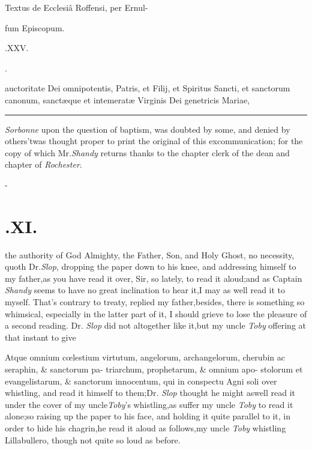 \documentclass{article}
\begin{document}
\null\smallskip
\centerline{Textus de Ecclesiâ Roffensi, per Ernul-}
\centerline{fum Episcopum.}
\bigskip
\centerline{\large{}.\quad XXV.}
\bigskip
\centerline{\large{}.}

 auctoritate Dei omnipotentis, Patris, et Filij, et Spiritus Sancti, et
sanctorum canonum, sanctæque et intemeratæ Virginis Dei genetricis Mariae,

\vfill
\bgroup\fontsize{8}{10}\selectfont
\hrule
{} \textit{Sor\-bonne} upon the question of
baptism, was doubted by some, and denied by others\tsh ’twas
thought proper to print the original of this excommunication; for the copy of
which Mr.\@ \textit{Shandy} returns thanks to the chapter clerk of the dean and
chapter of \textit{Rochester}.\par
\egroup
{}
\newpage
\def\alt#1#2{\hbox{\vbox to
3.6ex{\vss\openup-7pt\halign{##\cr\hss\tiny #2\hss\cr#1\cr}}}}
\def\c#1{\hbox to 0pt{\hss #1\hss}}
\null\kern-\baselineskip
\section{.\quad  XI.}

the authority of God Almighty, the Father, Son, and Holy Ghost,
no necessity, quoth Dr.\@ \textit{Slop}, dropping the paper down to his knee, and
addressing himself to my father,\tsh as you have read it over, Sir, so lately, to
read it aloud;\tsk\break and as Captain \textit{Shandy} seems to have no great inclination
to hear it,\tsh I may as well read it to myself. That’s contrary to treaty, replied
my father,\tsk besides, there is something so whimsical, especially in the latter
part of it, I should grieve to lose the pleasure of a second reading.  Dr.\@
\textit{Slop} did not altogether like it,\tsh but my uncle \textit{Toby} offering at
that instant to give

\null\vfill
\quad\tsh Atque omnium cœlestium\break
virtutum, angelorum, archangelorum,\break
{}\break
cherubin ac seraphin, \& sanctorum pa-\break
triarchum, prophetarum, \& omnium apo-\break
stolorum et evangelistarum, \& sanctorum\break
innocentum, qui in conspectu Agni soli
over whistling, and read it himself to them;\tsh Dr.\@
\textit{Slop} thought he might as\break well read it under the cover
of my uncle\break \textit{Toby}’s whistling,\tsk as suffer my uncle
\textit{Toby} to read it alone;\tsh so raising up the paper to
his face, and holding it quite parallel to it, in order to hide
his chagrin,\tsk\break he read it aloud as follows,\tsh my uncle
\textit{Toby} whistling Lillabullero, though not quite so loud
as before.
\end{document}
